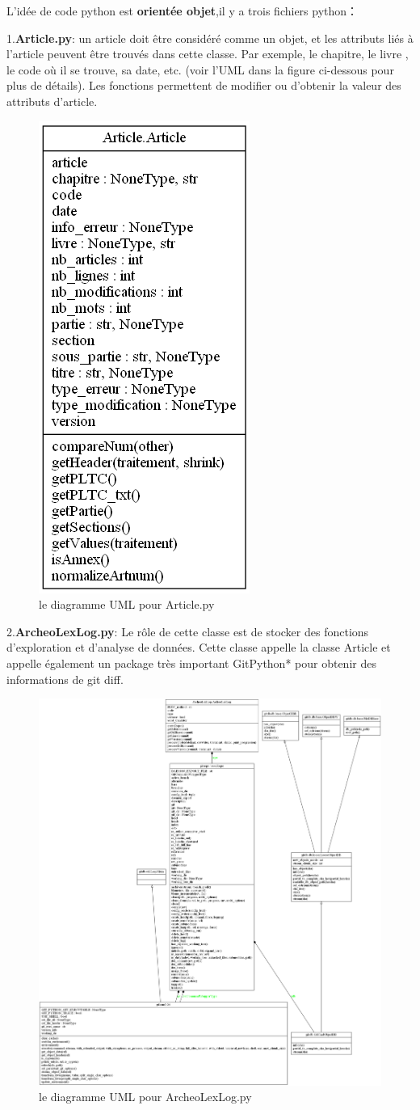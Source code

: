 \documentclass[
  oneside]{book}
\begin{document}
L'idée de code python est \textbf{orientée objet},il y a trois fichiers python：

1.\textbf{Article.py}: un article doit être considéré comme un objet, et les attributs liés à l'article peuvent être trouvés dans cette classe. Par exemple, le chapitre, le livre , le code où il se trouve, sa date, etc. (voir l'UML dans la figure ci-dessous pour plus de détails).
Les fonctions permettent de modifier ou d'obtenir la valeur des attributs d'article.

\begin{figure}

{\centering \includegraphics[width=0.25\linewidth]{images/Article_UML} 

}

\caption{le diagramme UML pour Article.py}\label{fig:Article}
\end{figure}

2.\textbf{ArcheoLexLog.py}:
Le rôle de cette classe est de stocker des fonctions d'exploration et d'analyse de données. Cette classe appelle la classe Article et appelle également un package très important GitPython* pour obtenir des informations de git diff.

\begin{figure}

{\centering \includegraphics[width=0.5\linewidth]{images/ArcheoLexLog_UML} 

}

\caption{le diagramme UML pour ArcheoLexLog.py}\label{fig:ArcheoLexLog}
\end{figure}
\end{document}

